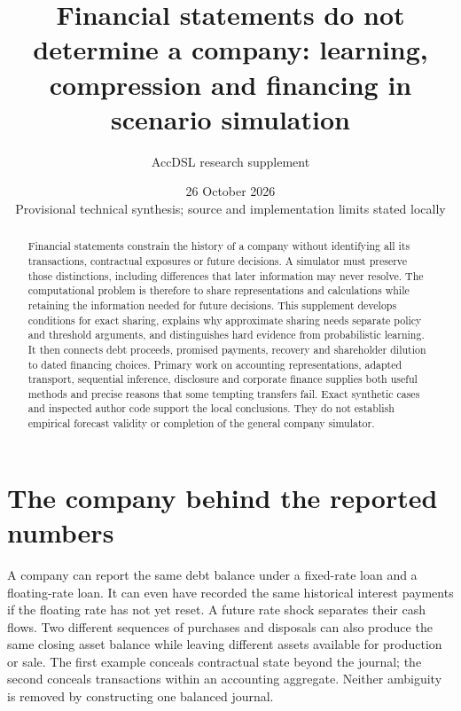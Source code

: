 \documentclass[11pt,a4paper]{article}
\title{Financial statements do not determine a company:  learning, compression and financing in scenario simulation}
\author{AccDSL research supplement}
\date{26 October 2026\\Provisional technical synthesis; source and implementation limits stated locally}
\begin{document}
\maketitle
\begin{abstract}
Financial statements constrain the history of a company without identifying all
its transactions, contractual exposures or future decisions. A simulator must
preserve those distinctions, including differences that later information may
never resolve. The computational problem is therefore to share representations
and calculations while retaining the information needed for future decisions.
This supplement develops conditions for exact sharing, explains why approximate
sharing needs separate policy and threshold arguments, and distinguishes hard
evidence from probabilistic learning. It then connects debt proceeds, promised
payments, recovery and shareholder dilution to dated financing choices. Primary
work on accounting representations, adapted transport, sequential inference,
disclosure and corporate finance supplies both useful methods and precise
reasons that some tempting transfers fail. Exact synthetic cases and inspected
author code support the local conclusions. They do not establish empirical
forecast validity or completion of the general company simulator.
\end{abstract}
\tableofcontents

\section{The company behind the reported numbers}
A company can report the same debt balance under a fixed-rate loan and a
floating-rate loan. It can even have recorded the same historical interest
payments if the floating rate has not yet reset. A future rate shock separates
their cash flows. Two different sequences of purchases and disposals can also
produce the same closing asset balance while leaving different assets available
for production or sale. The first example conceals contractual state beyond
the journal; the second conceals transactions within an accounting aggregate.
Neither ambiguity is removed by constructing one balanced journal.
\end{document}
